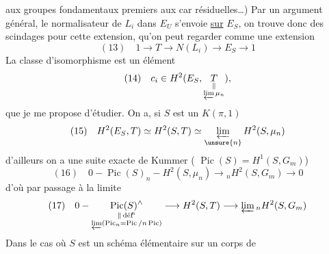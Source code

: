 aux groupes fondamentaux premiers aux car résiduelles\dots) Par un argument général, le normalisateur de $L_i$ dans $E_U$ s'envoie \uline{sur} $E_S$, on trouve donc des scindages pour cette extension, qu'on peut regarder comme une extension
\[
(13)\quad 1\longrightarrow T\longrightarrow N(L_i)\longrightarrow E_S\longrightarrow1
\]
La classe d'isomorphisme est un élément 
\[
(14)\quad c_i\in H^2(E_S,\underset{\substack{\Vert\\\varprojlim\mu_n}}{T}),
\]
que je me propose d'étudier. On a, si $S$ est un $K(\pi,1)$
\[
(15)\quad H^2(E_S,T)\simeq H^2(S,T)\simeq\varprojlim_{\unsure{n}} H^2(S,\mu_n)
\]
d'ailleurs on a une suite exacte de Kummer ( $\operatorname{Pic}(S)=H^1(S,G_m)$)
\[
(16)\quad 0-\operatorname{Pic}(S)_n-H^2(S,\mu_n)\longrightarrow {}_nH^2(S,G_m)\longrightarrow0
\]
d'où par passage à la limite
\[
(17)\quad 0-
\underset{\substack{\Vert\,\text{déf}\!^{\mathrm n}\\\varprojlim(\operatorname{Pic}_n=\operatorname{Pic}/n\operatorname{Pic})}}{\operatorname{Pic}(S)^\wedge}
\longrightarrow H^2(S,T)\longrightarrow\varprojlim {}_nH^2(S,G_m)
\]
Dans le cas où $S$ est un schéma élémentaire sur un corps de  
